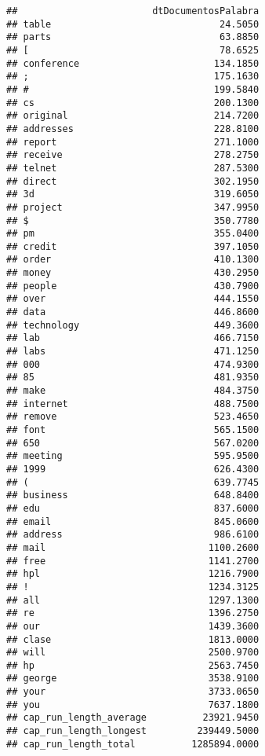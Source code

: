 \documentclass[
]{article}
\begin{document}
\begin{verbatim}
##                        dtDocumentosPalabra
## table                              24.5050
## parts                              63.8850
## [                                  78.6525
## conference                        134.1850
## ;                                 175.1630
## #                                 199.5840
## cs                                200.1300
## original                          214.7200
## addresses                         228.8100
## report                            271.1000
## receive                           278.2750
## telnet                            287.5300
## direct                            302.1950
## 3d                                319.6050
## project                           347.9950
## $                                 350.7780
## pm                                355.0400
## credit                            397.1050
## order                             410.1300
## money                             430.2950
## people                            430.7900
## over                              444.1550
## data                              446.8600
## technology                        449.3600
## lab                               466.7150
## labs                              471.1250
## 000                               474.9300
## 85                                481.9350
## make                              484.3750
## internet                          488.7500
## remove                            523.4650
## font                              565.1500
## 650                               567.0200
## meeting                           595.9500
## 1999                              626.4300
## (                                 639.7745
## business                          648.8400
## edu                               837.6000
## email                             845.0600
## address                           986.6100
## mail                             1100.2600
## free                             1141.2700
## hpl                              1216.7900
## !                                1234.3125
## all                              1297.1300
## re                               1396.2750
## our                              1439.3600
## clase                            1813.0000
## will                             2500.9700
## hp                               2563.7450
## george                           3538.9100
## your                             3733.0650
## you                              7637.1800
## cap_run_length_average          23921.9450
## cap_run_length_longest         239449.5000
## cap_run_length_total          1285894.0000
\end{verbatim}
\end{document}

